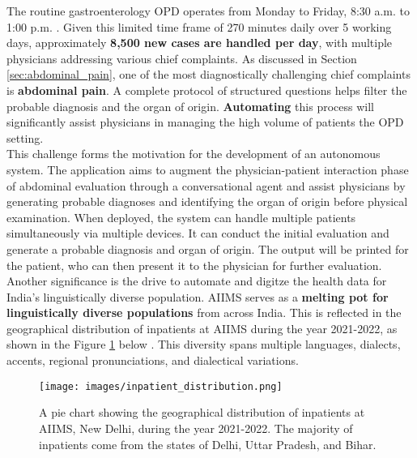 \noindent The routine gastroenterology OPD operates from Monday to Friday, 8:30 a.m. to 1:00 p.m. \cite{AIIMSOPD}. Given this limited time frame of 270 minutes daily over 5 working days, approximately \textcolor{TUMRed}{\textbf{8,500 new cases are handled per day}}, with multiple physicians addressing various chief complaints. As discussed in Section \ref{sec:abdominal_pain}, one of the most diagnostically challenging chief complaints is \textcolor{TUMRed}{\textbf{abdominal pain}}. A complete protocol of structured questions helps filter the probable diagnosis and the organ of origin. \textcolor{TUMRed}{\textbf{Automating}} this process will significantly assist physicians in managing the high volume of patients the OPD setting.\\[\baselineskip]

\noindent This challenge forms the motivation for the development of an autonomous system. The application aims to augment the physician-patient interaction phase of abdominal evaluation through a conversational agent and assist physicians by generating probable diagnoses and identifying the organ of origin before physical examination. When deployed, the system can handle multiple patients simultaneously via multiple devices. It can conduct the initial evaluation and generate a probable diagnosis and organ of origin. The output will be printed for the patient, who can then present it to the physician for further evaluation.\\[\baselineskip]

\noindent Another significance is the drive to automate and digitze the health data for India's linguistically diverse population. AIIMS serves as a \textcolor{TUMRed}{\textbf{melting pot for linguistically diverse populations}} from across India. This is reflected in the geographical distribution of inpatients at AIIMS during the year 2021-2022, as shown in the Figure \ref{fig:inpatient_distribution} below \cite{AIIMS2024}. This diversity spans multiple languages, dialects, accents, regional pronunciations, and dialectical variations.

\begin{figure}[H]
    \centering
    \texttt{[image: images/inpatient\_distribution.png]}
    \caption{A pie chart showing the geographical distribution of inpatients at AIIMS, New Delhi, during the year 2021-2022. The majority of inpatients come from the states of Delhi, Uttar Pradesh, and Bihar.}
    \label{fig:inpatient_distribution}
\end{figure}

